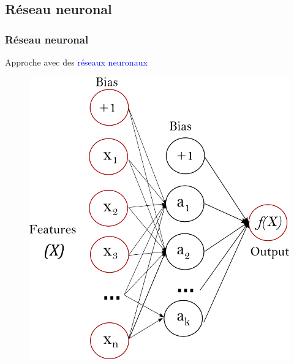 \documentclass{beamer}[aspectratio = 43]
\begin{document}
\subsection*{Réseau neuronal}
\begin{frame}
	\frametitle{Réseau neuronal}
	Approche avec des \textcolor{blue}{réseaux neuronaux}
	\begin{figure}[t]
		\centering
		\begin{minipage}{0.5\textwidth}
			\includegraphics[scale=0.2]{nn_sk}
		\end{minipage}
	\end{figure}
\end{frame}
\end{document}
